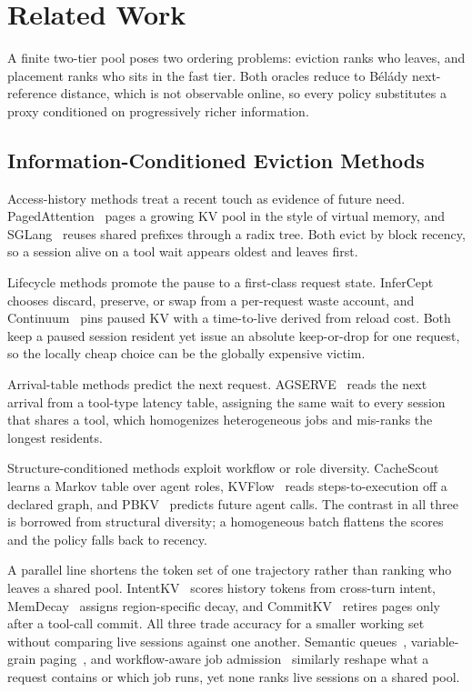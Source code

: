 \section{Related Work}
\label{sec:related}

A finite two-tier pool poses two ordering problems: eviction ranks who
leaves, and placement ranks who sits in the fast tier. Both oracles
reduce to B\'el\'ady next-reference distance, which is not observable
online, so every policy substitutes a proxy conditioned on progressively
richer information.

\subsection{Information-Conditioned Eviction Methods}
\label{sec:related-evict}

Access-history methods treat a recent touch as evidence of future need.
PagedAttention~\cite{kwon_pagedattention_2023} pages a growing KV pool
in the style of virtual memory, and
SGLang~\cite{zheng_sglang_2024} reuses shared prefixes through a radix
tree. Both evict by block recency, so a session alive on a tool wait
appears oldest and leaves first.

Lifecycle methods promote the pause to a first-class request state.
InferCept~\cite{abhyankar_infercept_2024} chooses discard, preserve, or
swap from a per-request waste account, and
Continuum~\cite{li_continuum_2026} pins paused KV with a time-to-live
derived from reload cost. Both keep a paused session resident yet issue
an absolute keep-or-drop for one request, so the locally cheap choice
can be the globally expensive victim.

Arrival-table methods predict the next request.
AGSERVE~\cite{agserve_2025} reads the next arrival from a tool-type
latency table, assigning the same wait to every session that shares a
tool, which homogenizes heterogeneous jobs and mis-ranks the longest
residents.

Structure-conditioned methods exploit workflow or role diversity.
CacheScout~\cite{cachescout_2026} learns a Markov table over agent
roles, KVFlow~\cite{pan_kvflow_2025} reads steps-to-execution off a
declared graph, and PBKV~\cite{zheng_pbkv_2026} predicts future agent
calls. The contrast in all three is borrowed from structural diversity;
a homogeneous batch flattens the scores and the policy falls back to
recency.

A parallel line shortens the token set of one trajectory rather than
ranking who leaves a shared pool.
IntentKV~\cite{li_intentkv_2026} scores history tokens from cross-turn
intent, MemDecay~\cite{matam_memdecay_2026} assigns region-specific
decay, and CommitKV~\cite{huang_commitkv_2026} retires pages only after
a tool-call commit. All three trade accuracy for a smaller working set
without comparing live sessions against one another.
Semantic queues~\cite{fang_saecache_2026}, variable-grain
paging~\cite{jeon_granikv_2026}, and workflow-aware job
admission~\cite{ni_topas_2026} similarly reshape what a request
contains or which job runs, yet none ranks live sessions on a shared
pool.


